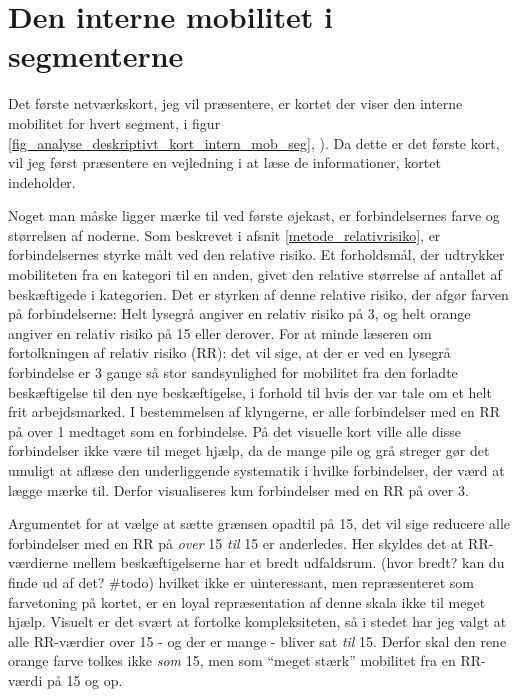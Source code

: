 \section{Den interne mobilitet i segmenterne \label{analyse_deskriptivt_within_mob_seg}}


Det første netværkskort, jeg vil præsentere, er kortet der viser den interne mobilitet for hvert segment,  i figur \ref{fig_analyse_deskriptivt_kort_intern_mob_seg}, ). %
Da dette er det første kort, vil jeg først præsentere en vejledning i at læse de informationer, kortet indeholder. 

Noget man måske ligger mærke til ved første øjekast, er forbindelsernes farve og størrelsen af noderne. Som beskrevet i afsnit \ref{metode_relativrisiko}, er forbindelsernes styrke målt ved den relative risiko. Et forholdsmål, der udtrykker mobiliteten fra en kategori til en anden, givet den relative størrelse af antallet af beskæftigede i kategorien. Det er styrken af denne relative risiko, der afgør farven på forbindelserne: Helt lysegrå angiver en relativ risiko på 3, og helt orange angiver en relativ risiko på 15 eller derover. For at minde læseren om fortolkningen af relativ risiko (RR):  det vil sige, at der er ved en lysegrå forbindelse er 3 gange så stor sandsynlighed for mobilitet fra den forladte beskæftigelse til den nye beskæftigelse, i forhold til hvis der var tale om et helt frit arbejdsmarked. I bestemmelsen af klyngerne, er alle forbindelser med en RR på over 1 medtaget som en forbindelse. På det visuelle kort ville alle disse forbindelser ikke være til meget hjælp, da de mange pile og grå streger gør det umuligt at aflæse den underliggende systematik i hvilke forbindelser, der værd at lægge mærke til. Derfor visualiseres kun forbindelser med en RR på over 3. 

Argumentet for at vælge at sætte grænsen opadtil på 15, det vil sige reducere alle forbindelser med en RR på \emph{over} 15 \emph{til} 15 er anderledes. Her skyldes det at RR-værdierne mellem beskæftigelserne har et bredt udfaldsrum. (hvor bredt? kan du finde ud af det? \#todo) hvilket ikke er uinteressant, men repræsenteret som farvetoning på kortet, er en loyal repræsentation af denne skala ikke til meget hjælp. Visuelt er det svært at fortolke kompleksiteten, så i stedet har jeg valgt at alle RR-værdier over 15 - og der er mange - bliver sat \emph{til} 15. Derfor skal den rene orange farve tolkes ikke \emph{som} 15, men som “meget stærk” mobilitet fra en RR-værdi på 15 og op.

